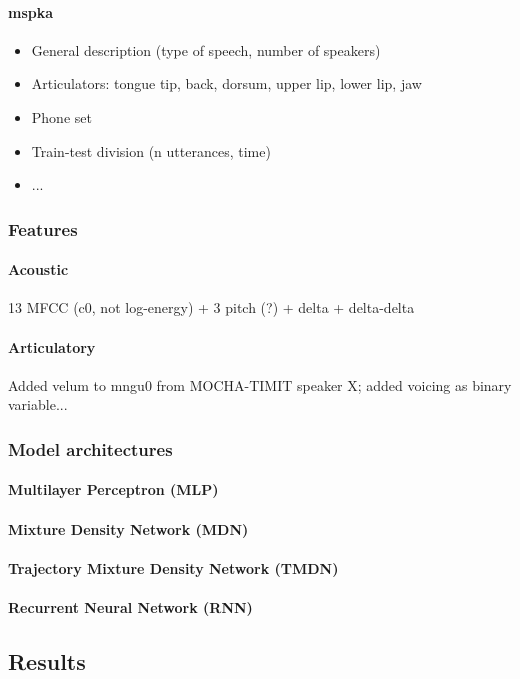 \paragraph{mspka}
\begin{itemize}
\item General description (type of speech, number of speakers)
\item Articulators: tongue {tip, back, dorsum}, upper lip, lower lip, jaw
\item Phone set
\item Train-test division (n utterances, time)
\item ...
\end{itemize}

\subsubsection{Features} 
\paragraph{Acoustic}
13 MFCC (c0, not log-energy) + 3 pitch (?) + delta + delta-delta
\paragraph{Articulatory}
{\color{red}Added velum to mngu0 from MOCHA-TIMIT speaker X; added voicing as binary variable...}


\subsubsection{Model architectures} 
\paragraph{Multilayer Perceptron (MLP)}
\paragraph{Mixture Density Network (MDN)}
\paragraph{Trajectory Mixture Density Network (TMDN)}
\paragraph{Recurrent Neural Network (RNN)}

\subsection{Results}
